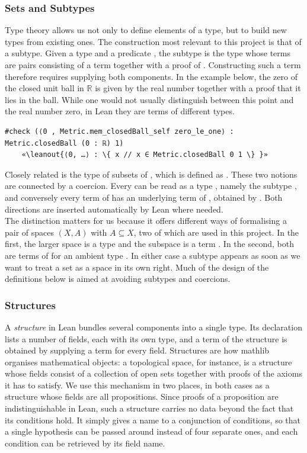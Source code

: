 \documentclass[11pt, a4paper, english]{article}
\newcommand{\leanout}[1]{{\normalfont\ttfamily\color{leanOutput} #1}}
\theoremstyle{plain}
\theoremstyle{definition}
\theoremstyle{remark}
\numberwithin{equation}{section}
\numberwithin{theorem}{section}
\begin{document}
\subsubsection{Sets and Subtypes} \label{subsubsec:sets}
Type theory allows us not only to define elements of a type, but to build new types from existing ones. The construction most relevant to this project is that of a subtype. Given a type  and a predicate , the subtype  is the type whose terms are pairs consisting of a term  together with a proof of . Constructing such a term therefore requires supplying both components. In the example below, the zero of the closed unit ball in $\mathbb{R}$ is given by the real number  together with a proof that it lies in the ball. While one would not usually distinguish between this point and the real number zero, in Lean they are terms of different types. 
\begin{verbatim}
#check (⟨0 , Metric.mem_closedBall_self zero_le_one⟩ : Metric.closedBall (0 : ℝ) 1)
    «\leanout{⟨0, …⟩ : \{ x // x ∈ Metric.closedBall 0 1 \} }»
\end{verbatim}

Closely related is the type  of subsets of , which is defined as . These two notions are connected by a coercion. Every  can be read as a type , namely the subtype , and conversely every term of  has an underlying term of , obtained by . Both directions are inserted automatically by Lean where needed. \\
The distinction matters for us because it offers different ways of formalising a pair of spaces $(X,A)$ with $A \subseteq X$, two of which are used in this project. In the first, the larger space is a type  and the subspace is a term . In the second, both are terms of  for an ambient type . In either case a subtype appears as soon as we want to treat a set as a space in its own right. Much of the design of the definitions below is aimed at avoiding subtypes and coercions.

\subsubsection{Structures} \label{subsubsec:structures}
A \emph{structure} in Lean bundles several components into a single type. Its declaration lists a number of fields, each with its own type, and a term of the structure is obtained by supplying a term for every field. Structures are how mathlib organises mathematical objects: a topological space, for instance, is a structure whose fields consist of a collection of open sets together with proofs of the axioms it has to satisfy.
We use this mechanism in two places, in both cases as a structure whose fields are all propositions. Since proofs of a proposition are indistinguishable in Lean, such a structure carries no data beyond the fact that its conditions hold. It simply gives a name to a conjunction of conditions, so that a single hypothesis can be passed around instead of four separate ones, and each condition can be retrieved by its field name.
\end{document}
